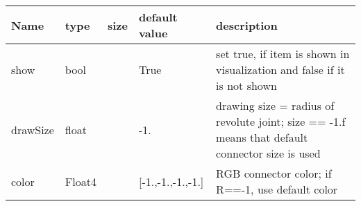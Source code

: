 \begin{center}
  \footnotesize
  \begin{longtable}{| p{4.5cm} | p{2.5cm} | p{0.5cm} | p{2.5cm} | p{6cm} |}
    \hline
    \bf Name & \bf type & \bf size & \bf default value & \bf description \\ \hline
    show &     bool &      &     True &     set true, if item is shown in visualization and false if it is not shown\\ \hline
    drawSize &     float &      &     -1. &     drawing size = radius of revolute joint; size == -1.f means that default connector size is used\\ \hline
    color &     Float4 &      &     [-1.,-1.,-1.,-1.] &     RGB connector color; if R==-1, use default color\\ \hline
	  \end{longtable}
	\end{center}

